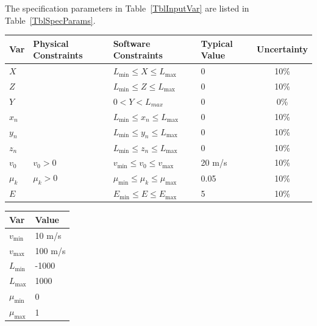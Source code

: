 \documentclass[12pt]{article}
\begin{document}
	The specification parameters in Table~\ref{TblInputVar} are listed in
	Table~\ref{TblSpecParams}.
	
	\begin{table}[!h]
		\caption{Input Variables} \label{TblInputVar}
		\renewcommand{\arraystretch}{1.2}
		\noindent \begin{longtable*}{l l l l c} 
			\toprule
			\textbf{Var} & \textbf{Physical Constraints} & \textbf{Software Constraints} &
			\textbf{Typical Value} & \textbf{Uncertainty}\\
			\midrule 
			$X$ &  & $L_{\text{min}} \leq X \leq L_{\text{max}}$ & 0 & 10\%
			\\
			$Z$ &  & $L_{\text{min}} \leq Z \leq L_{\text{max}}$ & 0 & 10\%
			\\
			$Y$ &  & $0 < Y < L_{max}$ & 0 & 0\%
			\\
			$x_{n}$ &  & $L_{\text{min}} \leq x_{n} \leq L_{\text{max}}$ & 0 & 10\%
			\\
			$y_{n}$ &  & $L_{\text{min}} \leq y_{n} \leq L_{\text{max}}$ & 0 & 10\%
			\\
			$z_{n}$ &  & $L_{\text{min}} \leq z_{n} \leq L_{\text{max}}$ & 0 & 10\%
			\\
			$v_{0}$ & $v_{0} > 0$ & $v_{\text{min}} \leq v_{0} \leq v_{\text{max}}$ & 20 m/s & 10\%
			\\
			$\mu_{k}$ & $\mu_{k} > 0$ & $\mu_{\text{min}} \leq \mu_{k} \leq \mu_{\text{max}}$ & 0.05 & 10\%
			\\
			$E$ &  & $E_{\text{min}} \leq E \leq E_{\text{max}}$ & 5 & 10\%
			\\
			\bottomrule
		\end{longtable*}
	\end{table}
	
	\noindent 
	
	\begin{table}[!h]
		\caption{Specification Parameter Values} \label{TblSpecParams}
		\renewcommand{\arraystretch}{1.2}
		\noindent \begin{longtable*}{l l} 
			\toprule
			\textbf{Var} & \textbf{Value} \\
			\midrule 
			$v_\text{min}$ & 10 m/s\\
			$v_\text{max}$ & 100 m/s\\
			$L_\text{min}$ & -1000\\
			$L_\text{max}$ & 1000\\
			$\mu_\text{min}$ & 0\\
			$\mu_\text{max}$ & 1\\
			\bottomrule
		\end{longtable*}
	\end{table}
	
\end{document}
